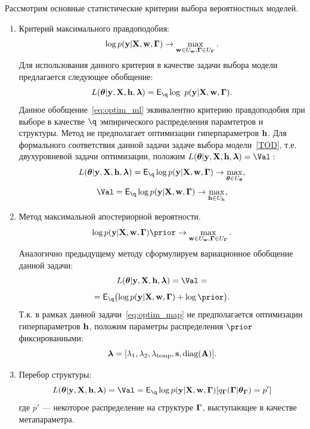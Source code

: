 Рассмотрим основные статистические критерии выбора вероятностных моделей. 
\begin{enumerate}
\item Критерий максимального правдоподобия:
\[\log p(\mathbf{y}|\mathbf{X}, \mathbf{w}, \boldsymbol{\Gamma}) \to \max_{\mathbf{w} \in U_\mathbf{w}, \boldsymbol{\Gamma} \in U_{\boldsymbol{\Gamma}}}.\]
Для использования данного критерия в качестве задачи выбора модели предлагается следующее обобщение:
\begin{equation}
\label{eq:optim_ml}
    \Loss =  \E_{\q} \log~\LL.
\end{equation}
Данное обобщение~\eqref{eq:optim_ml} эквивалентно  критерию правдоподобия при выборе в качестве $\q$ эмпирического распределения парамтетров и структуры.
Метод не предполагает оптимизации гиперпараметров $\mathbf{h}$. Для формального соответствия данной задачи задаче выбора модели~\eqref{TOD}, т.е. двухуровневой задачи оптимизации, положим $\Loss=\Val:$
\[
    \Loss =  \E_{\q}\log \LL \to \max_{\teta \in \Uteta},
\]
\[
    \Val =  \E_{\q}\log \LL \to \max_{\h \in \Uh},
\]



\item Метод максимальной апостериорной вероятности. 
\[\log \LL \prior \to \max_{\w  \in \Uw, \G \in \UG}.\]
Аналогично предыдущему методу сформулируем вариационное обобщение данной задачи:
\begin{equation}
\label{eq:optim_map}
\Loss = \Val = 
\end{equation}
\[
 = \E_{\q} \bigl( \log\LL + \log\prior \bigr).
\]
Т.к. в рамках данной задачи~\eqref{eq:optim_map} не предполагается оптимизации гиперпараметров $\mathbf{h}$, положим параметры распределения $\prior$ фиксированными:
\[
   \boldsymbol{\lambda} = [\lambda_1, \lambda_2, \lambda_{\text{temp}}, \mathbf{s}, \text{diag}(\mathbf{A})].
\]

\item Перебор структуры:
\begin{equation}
\label{eq:optim_struct}
    \Loss = \Val = \E_{\q} \log \LL [\qG = p']
\end{equation}
где $p'$ --- некоторое распределение на структуре $\boldsymbol{\Gamma}$, выступающее в качестве метапараметра.





\end{enumerate}
